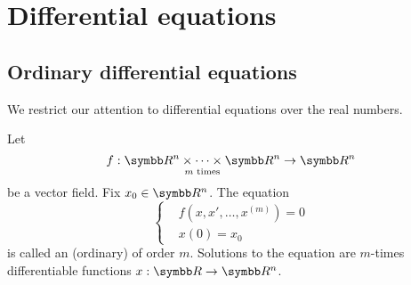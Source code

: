 \section{Differential equations}\label{sec:diffeq}
\subsection{Ordinary differential equations}\label{subsec:ordinary_differential_equations}

\begin{remark}\label{remark:real_ode}
  We restrict our attention to differential equations over the real numbers.
\end{remark}

\begin{definition}\label{def:ode}
  Let
  \begin{equation*}
    f: \underset {m \text{ times}} {\R^n \times \cdots \times \R^n} \to \R^n
  \end{equation*}
  be a vector field. Fix \( x_0 \in \R^n \). The equation
  \begin{equation*}
    \begin{cases}
      &f(x, x', \ldots, x^{(m)}) = 0 \\
      &x(0) = x_0
    \end{cases}
  \end{equation*}
  is called an (ordinary)  of order \( m \). Solutions to the equation are \( m \)-times differentiable functions \( x: \R \to \BB{R^n} \).
\end{definition}
